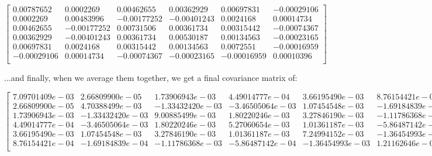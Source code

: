 \documentclass{article}
\begin{document}
\begin{equation}
    \begin{bmatrix}
        0.00787652  & 0.0002269   & 0.00462655  & 0.00362929  & 0.00697831  & -0.00029106 \\
        0.0002269   & 0.00483996  & -0.00177252 & -0.00401243 & 0.0024168   & 0.00014734  \\
        0.00462655  & -0.00177252 & 0.00731506  & 0.00361734  & 0.00315442  & -0.00074367 \\
        0.00362929  & -0.00401243 & 0.00361734  & 0.00530187  & 0.00134563  & -0.00023165 \\
        0.00697831  & 0.0024168   & 0.00315442  & 0.00134563  & 0.0072551   & -0.00016959 \\
        -0.00029106 & 0.00014734  & -0.00074367 & -0.00023165 & -0.00016959 & 0.00010396  \\
    \end{bmatrix}
\end{equation}

...and finally, when we average them together, we get a final covariance matrix of:

\begin{equation}
    \begin{bmatrix}
        7.09701409e-03 & 2.66809900e-05  & 1.73906943e-03  & 4.49014777e-04  & 3.66195490e-03  & 8.76154421e-04  \\
        2.66809900e-05 & 4.70388499e-03  & -1.33432420e-03 & -3.46505064e-03 & 1.07454548e-03  & -1.69184839e-04 \\
        1.73906943e-03 & -1.33432420e-03 & 9.00885499e-03  & 1.80220246e-03  & 3.27846190e-03  & -1.11786368e-03 \\
        4.49014777e-04 & -3.46505064e-03 & 1.80220246e-03  & 5.27060654e-03  & 1.01361187e-03  & -5.86487142e-04 \\
        3.66195490e-03 & 1.07454548e-03  & 3.27846190e-03  & 1.01361187e-03  & 7.24994152e-03  & -1.36454993e-03 \\
        8.76154421e-04 & -1.69184839e-04 & -1.11786368e-03 & -5.86487142e-04 & -1.36454993e-03 & 1.21162646e-03  \\
    \end{bmatrix}
\end{equation}
\end{document}
